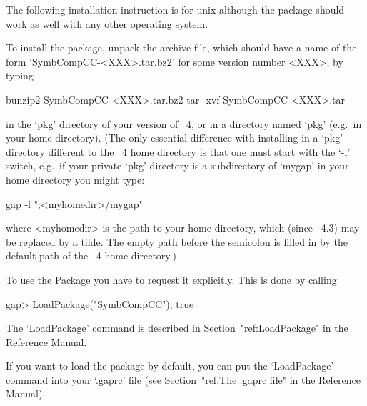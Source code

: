 


The following installation instruction is for unix although the package
should work as well with any other operating system.

To install the {\SymbCompCC} package, unpack the archive file, which  should
have a name of the form `SymbCompCC-<XXX>.tar.bz2' for some version number 
<XXX>, by typing

bunzip2 SymbCompCC-<XXX>.tar.bz2
tar -xvf SymbCompCC-<XXX>.tar

in the `pkg' directory of your version of {\GAP}~4,  or  in  a  directory
named `pkg' (e.g.~in your home directory). (The only essential difference
with installing {\SymbCompCC} in a `pkg' directory different to the {\GAP}~4
home directory is that one  must  start  {\GAP}  with  the  `-l'  switch,
e.g.~if your private `pkg' directory is a subdirectory of `mygap' in your
home directory you might type:

gap -l ";<myhomedir>/mygap"

where <myhomedir> is the  path  to  your  home  directory,  which  (since
{\GAP}~4.3) may be replaced  by  a  tilde.  The  empty  path  before  the
semicolon is  filled  in  by  the  default  path  of  the  {\GAP}~4  home
directory.)


To use the {\SymbCompCC} Package you have to request it explicitly. This  is
done by calling

\beginexample
gap> LoadPackage("SymbCompCC");
true
\endexample

The `LoadPackage' command is described  in  Section~"ref:LoadPackage"  in
the {\GAP} Reference Manual.

If you want to load the {\SymbCompCC} package by default, you  can  put  the
`LoadPackage' command  into  your  `.gaprc'  file  (see  Section~"ref:The
.gaprc file" in the {\GAP} Reference Manual).

